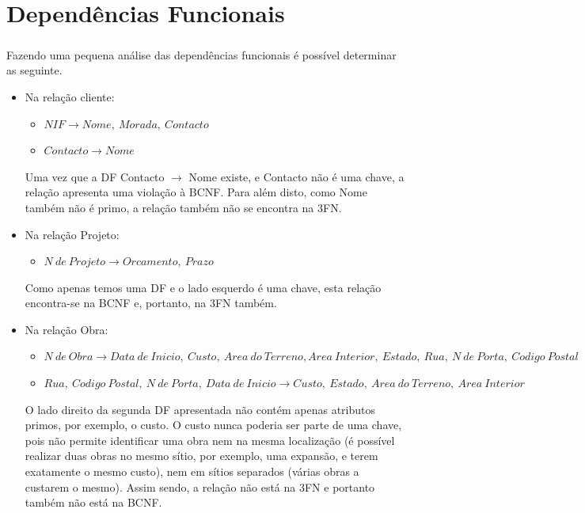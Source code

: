 \documentclass{report}
\begin{document}
	\chapter{Dependências Funcionais}
	
		\paragraph{}Fazendo uma pequena análise das dependências funcionais é possível
		determinar as seguinte.
		
		\begin{itemize}
			\item Na relação cliente:
			\begin{itemize}
				\item $NIF \rightarrow Nome,\  Morada,\ Contacto$
				\item $Contacto \rightarrow Nome$
			\end{itemize}
			
			Uma vez que a DF Contacto $\rightarrow$ Nome existe, e Contacto não é uma
			chave, a relação apresenta uma violação à BCNF. Para além disto, como Nome também
			não é primo, a relação também não se encontra na 3FN.
			
			\item Na relação Projeto:
			\begin{itemize}
				\item $N\ de\ Projeto \rightarrow Orcamento,\ Prazo$
			\end{itemize}
			
			Como apenas temos uma DF e o lado esquerdo é uma chave, esta relação encontra-se
			na BCNF e, portanto, na 3FN também.
			
			\item Na relação Obra:
			\begin{itemize}
				\item $N\ de\ Obra \rightarrow Data\ de\ Inicio,\ Custo,\ Area\ do\ Terreno,
				Area\ Interior,\ Estado,\ Rua,\ N\ de\ Porta,\ Codigo\ Postal$
				\item $Rua,\ Codigo\ Postal,\ N\ de\ Porta,\ Data\ de\ Inicio \rightarrow
				 Custo,\ Estado,\ Area\ do\ Terreno,\ Area\ Interior$
			\end{itemize}
			
			O lado direito da segunda DF apresentada não contém apenas atributos primos, por 
			exemplo, o custo. O custo nunca poderia ser parte de uma chave, pois não permite 
			identificar uma obra nem na mesma localização (é possível realizar duas obras no 
			mesmo sítio, por exemplo, uma expansão, e terem exatamente o mesmo custo), nem em 
			sítios separados (várias obras a custarem o mesmo). Assim sendo, a relação não 
			está na 3FN e portanto também não está na BCNF.
			

\end{itemize}
\end{document}
